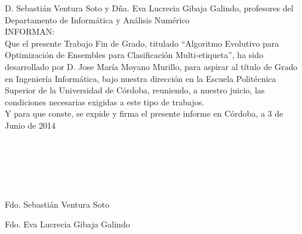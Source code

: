 D. Sebastián Ventura Soto y Dña. Eva Lucrecia Gibaja Galindo, profesores del Departamento de Informática y Análisis Numérico\\

INFORMAN:\\

Que el presente Trabajo Fin de Grado, titulado ``Algoritmo Evolutivo para Optimización de Ensembles para Clasificación Multi-etiqueta'', ha sido desarrollado por D. Jose María Moyano Murillo, para aspirar al título de Grado en Ingeniería Informática, bajo nuestra dirección en la Escuela Politécnica Superior de la Universidad de Córdoba, reuniendo, a nuestro juicio, las condiciones necesarias exigidas a este tipo de trabajos.\\

Y para que conste, se expide y firma el presente informe en Córdoba, a 3 de Junio de 2014\\\\\\\\\\\\



\begin{multicols}{2}

Fdo. Sebastián Ventura Soto

Fdo. Eva Lucrecia Gibaja Galindo

\end{multicols}